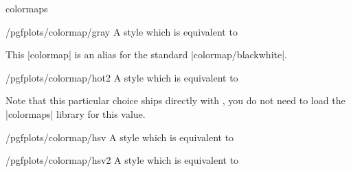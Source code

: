 \begin{pgfplotslibrary}{colormaps}
\begin{stylekey}{/pgfplots/colormap/gray}
    A style which is equivalent to
\begin{codeexample}
\end{codeexample}

    This |colormap| is an alias for the standard |colormap/blackwhite|.

    \matlabcolormaptext
\end{stylekey}

\begin{stylekey}{/pgfplots/colormap/hot2}
    A style which is equivalent to
\begin{codeexample}
\end{codeexample}

    Note that this particular choice ships directly with \PGFPlots{}, you do
    not need to load the |colormaps| library for this value.

    \matlabcolormaptext
\end{stylekey}

\begin{stylekey}{/pgfplots/colormap/hsv}
    A style which is equivalent to
\begin{codeexample}
\end{codeexample}
     \par \matlabcolormaptext
\end{stylekey}

\begin{stylekey}{/pgfplots/colormap/hsv2}
    A style which is equivalent to
\begin{codeexample}
\end{codeexample}
     \par \matlabcolormaptext
\end{stylekey}


\end{pgfplotslibrary}

